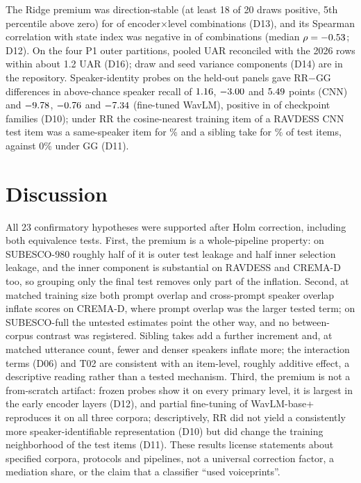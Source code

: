 \documentclass{article}
\begin{document}
The Ridge premium was direction-stable (at least 18 of 20 draws positive, 5th percentile above zero) for \DThirteenStable{} of \DThirteenTotal{} encoder$\times$level combinations (D13), and its Spearman correlation with state index was negative in \DTwelveNegRho{} of \DTwelveTotal{} combinations (median $\rho=-0.53$; D12).
On the four P1 outer partitions, pooled UAR reconciled with the 2026 rows within about 1.2 UAR (D16); draw and seed variance components (D14) are in the repository.
Speaker-identity probes on the held-out panels gave RR$-$GG differences in above-chance speaker recall of $1.16$, $-3.00$ and $5.49$ points (CNN) and $-9.78$, $-0.76$ and $-7.34$ (fine-tuned WavLM), positive in \DTenPositive{} of \DTenTotal{} checkpoint families (D10); under RR the cosine-nearest training item of a RAVDESS CNN test item was a same-speaker item for \DElevenCtrlRavCnnRRSamespeaker\% and a sibling take for \DElevenCtrlRavCnnRRSibling\% of test items, against 0\% under GG (D11).

\section{Discussion}
All 23 confirmatory hypotheses were supported after Holm correction, including both equivalence tests.
First, the premium is a whole-pipeline property: on SUBESCO-980 roughly half of it is outer test leakage and half inner selection leakage, and the inner component is substantial on RAVDESS and CREMA-D too, so grouping only the final test removes only part of the inflation.
Second, at matched training size both prompt overlap and cross-prompt speaker overlap inflate scores on CREMA-D, where prompt overlap was the larger tested term; on SUBESCO-full the untested estimates point the other way, and no between-corpus contrast was registered.
Sibling takes add a further increment and, at matched utterance count, fewer and denser speakers inflate more; the interaction terms (D06) and T02 are consistent with an item-level, roughly additive effect, a descriptive reading rather than a tested mechanism.
Third, the premium is not a from-scratch artifact: frozen probes show it on every primary level, it is largest in the early encoder layers (D12), and partial fine-tuning of WavLM-base+ reproduces it on all three corpora; descriptively, RR did not yield a consistently more speaker-identifiable representation (D10) but did change the training neighborhood of the test items (D11).
These results license statements about specified corpora, protocols and pipelines, not a universal correction factor, a mediation share, or the claim that a classifier ``used voiceprints''.
\end{document}
